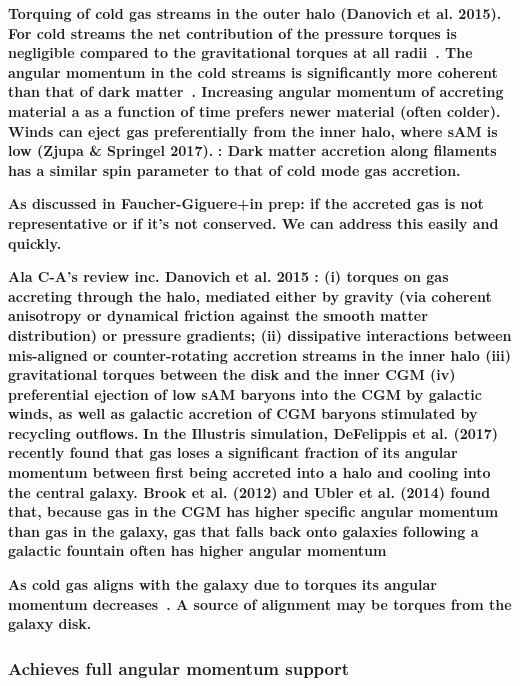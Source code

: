 \documentclass[fleqn,usenatbib]{mnras}
\begin{document}
\textbf{
Torquing of cold gas streams in the outer halo (Danovich et al. 2015).
For cold streams the net contribution of the pressure torques is negligible compared to the gravitational torques at all radii~\citep{danovichFourPhasesAngularmomentum2015}.
The angular momentum in the cold streams is significantly more coherent than that of dark matter~\citep{danovichFourPhasesAngularmomentum2015}.
Increasing angular momentum of accreting material a as a function of time prefers newer material (often colder).
Winds can eject gas preferentially from the inner halo, where sAM is low (Zjupa \& Springel 2017).
}
\textbf{\cite{stewartAngularMomentumAcquisition2013}: Dark matter accretion along filaments has a similar spin parameter to that of cold mode gas accretion.}

\textbf{
As discussed in Faucher-Giguere+in prep:
if the accreted gas is not representative or if it's not conserved.
We can address this easily and quickly.
}

\textbf{
Ala C-A's review inc. Danovich et al. 2015 :
(i) torques on gas accreting through the halo, mediated either by gravity (via coherent anisotropy or dynamical friction against the smooth matter distribution) or pressure gradients;
(ii) dissipative interactions between mis-aligned or counter-rotating accretion streams in the inner halo
(iii) gravitational torques between the disk and the inner CGM
(iv) preferential ejection of low sAM baryons into the CGM by galactic winds, as well as galactic accretion of CGM baryons stimulated by recycling outflows.
}
\textbf{
In the Illustris simulation, DeFelippis et al. (2017) recently found that gas loses a significant fraction of its angular momentum between first being accreted into a halo and cooling into the central galaxy. Brook et al. (2012) and Ubler et al. (2014) found that, because gas in the CGM has higher specific angular momentum than gas in the galaxy, gas that falls back onto galaxies following a galactic fountain often has higher angular momentum
}

\textbf{
As cold gas aligns with the galaxy due to torques its angular momentum decreases~\citep{danovichFourPhasesAngularmomentum2015}.
A source of alignment may be torques from the galaxy disk.
}

\subsubsection{Achieves full angular momentum support}
\end{document}
